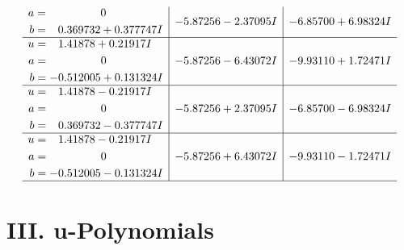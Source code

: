 \documentclass[1p]{elsarticle_modified}
\theoremstyle{definition}
\begin{document}
$$\begin{array}{c|c|c}
\begin{aligned}
a &= \phantom{-0.000000 } 0 \\
b &= \phantom{-}0.369732 + 0.377747 I\end{aligned}
 & -5.87256 - 2.37095 I & -6.85700 + 6.98324 I \\ \hline\begin{aligned}
u &= \phantom{-}1.41878 + 0.21917 I \\
a &= \phantom{-0.000000 } 0 \\
b &= -0.512005 + 0.131324 I\end{aligned}
 & -5.87256 - 6.43072 I & -9.93110 + 1.72471 I \\ \hline\begin{aligned}
u &= \phantom{-}1.41878 - 0.21917 I \\
a &= \phantom{-0.000000 } 0 \\
b &= \phantom{-}0.369732 - 0.377747 I\end{aligned}
 & -5.87256 + 2.37095 I & -6.85700 - 6.98324 I \\ \hline\begin{aligned}
u &= \phantom{-}1.41878 - 0.21917 I \\
a &= \phantom{-0.000000 } 0 \\
b &= -0.512005 - 0.131324 I\end{aligned}
 & -5.87256 + 6.43072 I & -9.93110 - 1.72471 I\\
 \hline 
 \end{array}$$\newpage
\newpage\renewcommand{\arraystretch}{1}
\centering \section*{ III. u-Polynomials}
\end{document}
